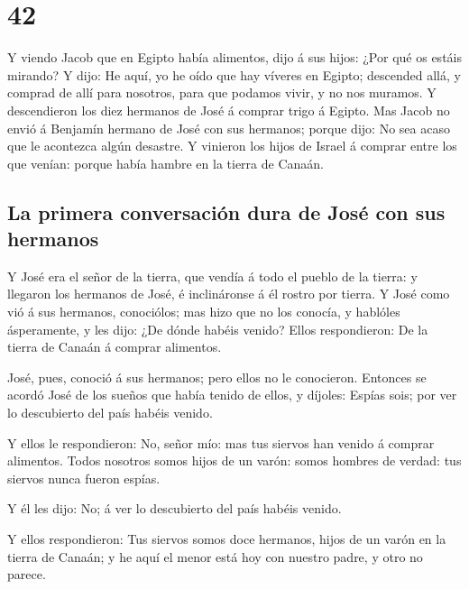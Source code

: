 \hypertarget{section-01-42}{%
\section{42}\label{section-01-42}}

 Y viendo Jacob que en Egipto había alimentos, dijo á sus
hijos: ¿Por qué os estáis mirando?  Y dijo: He aquí, yo he
oído que hay víveres en Egipto; descended allá, y comprad de allí para
nosotros, para que podamos vivir, y no nos muramos.  Y
descendieron los diez hermanos de José á comprar trigo á Egipto.
 Mas Jacob no envió á Benjamín hermano de José con sus
hermanos; porque dijo: No sea acaso que le acontezca algún desastre.
 Y vinieron los hijos de Israel á comprar entre los que
venían: porque había hambre en la tierra de Canaán.

\hypertarget{la-primera-conversaciuxf3n-dura-de-josuxe9-con-sus-hermanos}{%
\subsection{La primera conversación dura de José con sus
hermanos}\label{la-primera-conversaciuxf3n-dura-de-josuxe9-con-sus-hermanos}}

 Y José era el señor de la tierra, que vendía á todo el
pueblo de la tierra: y llegaron los hermanos de José, é inclináronse á
él rostro por tierra.  Y José como vió á sus hermanos,
conociólos; mas hizo que no los conocía, y hablóles ásperamente, y les
dijo: ¿De dónde habéis venido? Ellos respondieron: De la tierra de
Canaán á comprar alimentos.

 José, pues, conoció á sus hermanos; pero ellos no le
conocieron.  Entonces se acordó José de los sueños que
había tenido de ellos, y díjoles: Espías sois; por ver lo descubierto
del país habéis venido.

 Y ellos le respondieron: No, señor mío: mas tus siervos
han venido á comprar alimentos.  Todos nosotros somos
hijos de un varón: somos hombres de verdad: tus siervos nunca fueron
espías.

 Y él les dijo: No; á ver lo descubierto del país habéis
venido.

 Y ellos respondieron: Tus siervos somos doce hermanos,
hijos de un varón en la tierra de Canaán; y he aquí el menor está hoy
con nuestro padre, y otro no parece.

